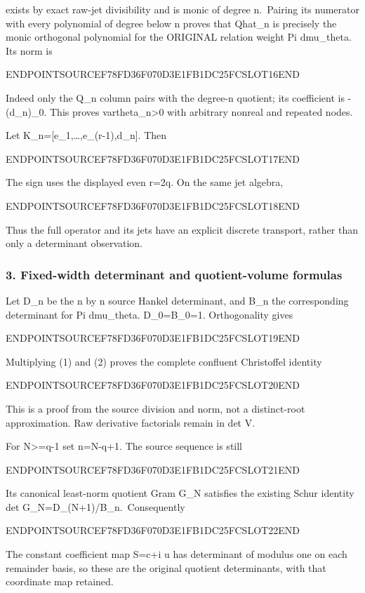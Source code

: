 exists by exact raw-jet divisibility and is monic of degree n.~Pairing its numerator with every polynomial of degree below n proves that Qhat\_n is precisely the monic orthogonal polynomial for the ORIGINAL relation weight Pi dmu\_theta. Its norm is

ENDPOINTSOURCEF78FD36F070D3E1FB1DC25FCSLOT16END

Indeed only the Q\_n column pairs with the degree-n quotient; its coefficient is -(d\_n)\_0. This proves vartheta\_n\textgreater0 with arbitrary nonreal and repeated nodes.

Let K\_n={[}e\_1,\ldots,e\_(r-1),d\_n{]}. Then

ENDPOINTSOURCEF78FD36F070D3E1FB1DC25FCSLOT17END

The sign uses the displayed even r=2q. On the same jet algebra,

ENDPOINTSOURCEF78FD36F070D3E1FB1DC25FCSLOT18END

Thus the full operator and its jets have an explicit discrete transport, rather than only a determinant observation.

\subsubsection{3. Fixed-width determinant and quotient-volume formulas}\label{endpoint-pr24_current_corrected--fixed-width-determinant-and-quotient-volume-formulas}

Let D\_n be the n by n source Hankel determinant, and B\_n the corresponding determinant for Pi dmu\_theta. D\_0=B\_0=1. Orthogonality gives

ENDPOINTSOURCEF78FD36F070D3E1FB1DC25FCSLOT19END

Multiplying (1) and (2) proves the complete confluent Christoffel identity

ENDPOINTSOURCEF78FD36F070D3E1FB1DC25FCSLOT20END

This is a proof from the source division and norm, not a distinct-root approximation. Raw derivative factorials remain in det V.

For N\textgreater=q-1 set n=N-q+1. The source sequence is still

ENDPOINTSOURCEF78FD36F070D3E1FB1DC25FCSLOT21END

Its canonical least-norm quotient Gram G\_N satisfies the existing Schur identity det G\_N=D\_(N+1)/B\_n.~Consequently

ENDPOINTSOURCEF78FD36F070D3E1FB1DC25FCSLOT22END

The constant coefficient map S=c+i u has determinant of modulus one on each remainder basis, so these are the original quotient determinants, with that coordinate map retained.

